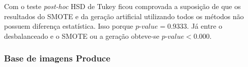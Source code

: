 
Com o teste \textit{post-hoc} HSD de Tukey ficou comprovada a suposição de que os resultados do SMOTE e da geração artificial utilizando todos os métodos não possuem diferença estatística. Isso porque $\textit{p-value} = 0.9333$. Já entre o desbalanceado e o SMOTE ou a geração obteve-se $\textit{p-value} < 0.000$.




\subsubsection{Base de imagens Produce}


